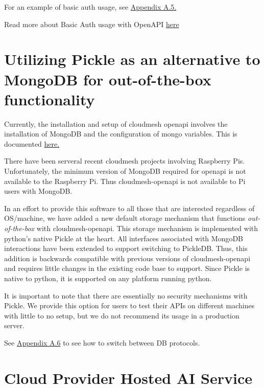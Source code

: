 For an example of basic auth usage, see
\protect\hyperlink{a5-basic-auth-example}{Appendix A.5.}

Read more about Basic Auth usage with OpenAPI
\href{https://swagger.io/docs/specification/authentication/basic-authentication/}{here}

\section{Utilizing Pickle as an alternative to MongoDB for
  out-of-the-box
  functionality}\label{utilizing-pickle-as-an-alternative-to-mongodb-for-out-of-the-box-functionality}

Currently, the installation and setup of cloudmesh openapi involves the
installation of MongoDB and the configuration of mongo variables. This
is documented
\href{https://github.com/cloudmesh/cloudmesh-openapi\#installation}{here.}

There have been serveral recent cloudmesh projects involving Raspberry
Pis. Unfortunately, the minimum version of MongoDB required for openapi
is not available to the Raspberry Pi. Thus cloudmesh-openapi is not
available to Pi users with MongoDB.

In an effort to provide this software to all those that are interested
regardless of OS/machine, we have added a new default storage mechanism
that functions {\em out-of-the-box} with cloudmesh-openapi. This storage
mechanism is implemented with python's native Pickle at the heart. All
interfaces associated with MongoDB interactions have been extended to
support switching to PickleDB. Thus, this addition is backwards
compatible with previous versions of cloudmesh-openapi and requires
little changes in the existing code base to support. Since Pickle is
native to python, it is supported on any platform running python.

It is important to note that there are essentially no security
mechanisms with Pickle. We provide this option for users to test their
APIs on different machines with little to no setup, but we do not
recommend its usage in a production server.

See
\protect\hyperlink{a6-switching-between-pickledb-and-mongodb}{Appendix
A.6} to see how to switch between DB protocols.

\section{Cloud Provider Hosted AI
Service}\label{cloud-provider-hosted-ai-service}

